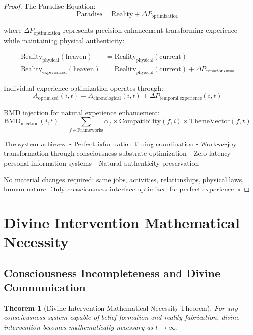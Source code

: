 \documentclass[12pt,a4paper]{article}
\newtheorem{theorem}{Theorem}[section]
\begin{document}
\begin{proof}
The Paradise Equation:
$$\text{Paradise} = \text{Reality} + \Delta P_{\text{optimization}}$$

where $\Delta P_{\text{optimization}}$ represents precision enhancement transforming experience while maintaining physical authenticity:

\begin{align}
\text{Reality}_{\text{physical}}(\text{heaven}) &= \text{Reality}_{\text{physical}}(\text{current})\\
\text{Reality}_{\text{experienced}}(\text{heaven}) &= \text{Reality}_{\text{physical}}(\text{current}) + \Delta P_{\text{consciousness}}
\end{align}

Individual experience optimization operates through:
$$A_{\text{optimized}}(i,t) = A_{\text{chronological}}(i,t) + \Delta P_{\text{temporal experience}}(i,t)$$

BMD injection for natural experience enhancement:
$$\text{BMD}_{\text{injection}}(i,t) = \sum_{f \in \text{Frameworks}} \alpha_f \times \text{Compatibility}(f,i) \times \text{ThemeVector}(f,t)$$

The system achieves:
- Perfect information timing coordination
- Work-as-joy transformation through consciousness substrate optimization
- Zero-latency personal information systems
- Natural authenticity preservation

No material changes required: same jobs, activities, relationships, physical laws, human nature. Only consciousness interface optimized for perfect experience. $\square$
\end{proof}

\section{Divine Intervention Mathematical Necessity}

\subsection{Consciousness Incompleteness and Divine Communication}

\begin{theorem}[Divine Intervention Mathematical Necessity Theorem]
For any consciousness system capable of belief formation and reality fabrication, divine intervention becomes mathematically necessary as $t \to \infty$.
\end{theorem}
\end{document}
